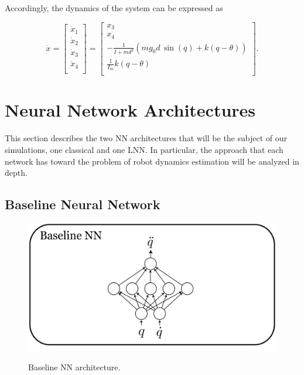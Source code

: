 \documentclass[a4paper]{article}
\begin{document}
Accordingly, the dynamics of the system can be expressed as

\begin{equation}
    \nonumber
    \dot{x} = 
    \begin{bmatrix}    
        \dot{x}_1 \\
        \dot{x}_2 \\
        \dot{x}_3 \\
        \dot{x}_4 \\
    \end{bmatrix} = \begin{bmatrix}    
        x_3\\
        x_4\\
        -\frac{1}{I+md^2} (mg_0d\, \sin(q) + k(q-\theta))\\
        \frac{1}{I_m} k(q-\theta)\\
    \end{bmatrix}.
\end{equation}


\section{Neural Network Architectures}
\label{sec:nn_arch}
This section describes the two NN architectures that will be the subject of our simulations, one classical and one LNN. In particular, the approach that each network has toward the problem of robot dynamics estimation will be analyzed in depth.
\subsection{Baseline Neural Network}
\begin{figure}
\begin{center}
    \label{img:baseline_arch}
    \includegraphics[scale=0.1]{./img/baseline_nn.png}  
    \caption{Baseline NN architecture.}
\end{center}
\end{figure}
\end{document}

